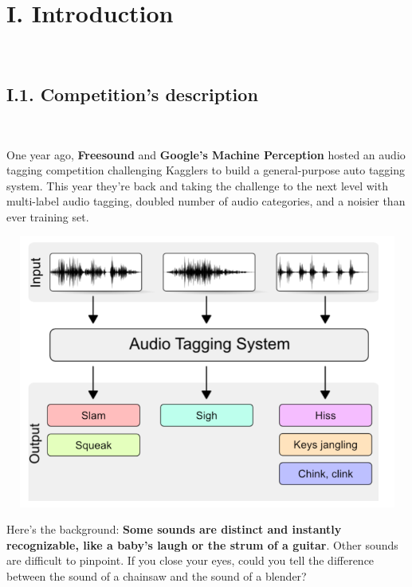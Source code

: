 \documentclass[11pt, a4papper]{report}
\theoremstyle{plain}
\theoremstyle{definition}
\theoremstyle{definition}
\theoremstyle{proposition}
\begin{document}


\chapter*{I. Introduction}
\

\section*{I.1. Competition's description}
\

One year ago, \textbf{Freesound} and \textbf{Google’s Machine Perception} hosted an audio tagging competition challenging Kagglers to build a general-purpose auto tagging system. This year they’re back and taking the challenge to the next level with multi-label audio tagging, doubled number of audio categories, and a noisier than ever training set. \cite{1}

\begin{center}
\includegraphics[width=16.5cm,height=9cm,keepaspectratio]{competiton-description}
\end{center}

Here's the background: \textbf{Some sounds are distinct and instantly recognizable, like a baby’s laugh or the strum of a guitar}. Other sounds are difficult to pinpoint. If you close your eyes, could you tell the difference between the sound of a chainsaw and the sound of a blender?
\\
\end{document}
